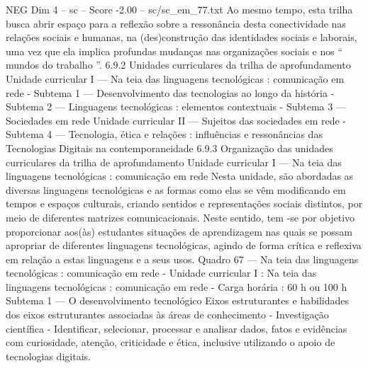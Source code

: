 \begin{textsample}{NEG Dim 4 – sc – Score -2.00 – sc/sc\_em\_77.txt}
Ao mesmo tempo, esta trilha busca abrir espaço para a reflexão sobre a ressonância desta conectividade nas relações sociais e humanas, na (des)construção das identidades sociais e laborais, uma vez que ela implica profundas mudanças nas organizações sociais e nos “ mundos do trabalho ”. 6.9.2 Unidades curriculares da trilha de aprofundamento Unidade curricular I — Na teia das linguagens tecnológicas : comunicação em rede - Subtema 1 — Desenvolvimento das tecnologias ao longo da história - Subtema 2 — Linguagens tecnológicas : elementos contextuais - Subtema 3 — Sociedades em rede Unidade curricular II — Sujeitos das sociedades em rede - Subtema 4 — Tecnologia, ética e relações : influências e ressonâncias das Tecnologias Digitais na contemporaneidade 6.9.3 Organização das unidades curriculares da trilha de aprofundamento Unidade curricular I — Na teia das linguagens tecnológicas : comunicação em rede Nesta unidade, são abordadas as diversas linguagens tecnológicas e as formas como elas se vêm modificando em tempos e espaços culturais, criando sentidos e representações sociais distintos, por meio de diferentes matrizes comunicacionais.
Neste sentido, tem -se por objetivo proporcionar aos(às) estudantes situações de aprendizagem nas quais se possam apropriar de diferentes linguagens tecnológicas, agindo de forma crítica e reflexiva em relação a estas linguagens e a seus usos.
Quadro 67 — Na teia das linguagens tecnológicas : comunicação em rede - Unidade curricular I : Na teia das linguagens tecnológicas : comunicação em rede - Carga horária : 60 h ou 100 h Subtema 1 — O desenvolvimento tecnológico Eixos estruturantes e habilidades dos eixos estruturantes associadas às áreas de conhecimento - Investigação científica - Identificar, selecionar, processar e analisar dados, fatos e evidências com curiosidade, atenção, criticidade e ética, inclusive utilizando o apoio de tecnologias digitais.

\end{textsample}
